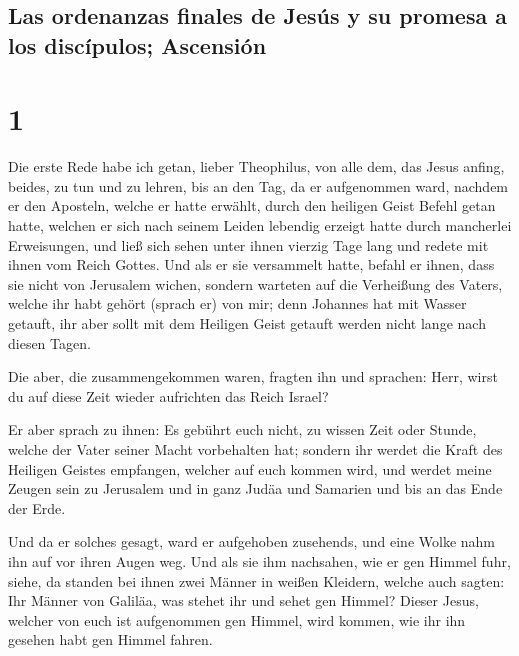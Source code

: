 \hypertarget{las-ordenanzas-finales-de-jesuxfas-y-su-promesa-a-los-discuxedpulos-ascensiuxf3n}{%
\subsection{Las ordenanzas finales de Jesús y su promesa a los
discípulos;
Ascensión}\label{las-ordenanzas-finales-de-jesuxfas-y-su-promesa-a-los-discuxedpulos-ascensiuxf3n}}

\hypertarget{section}{%
\section{1}\label{section}}

 Die erste Rede habe ich getan, lieber Theophilus, von
alle dem, das Jesus anfing, beides, zu tun und zu lehren, 
bis an den Tag, da er aufgenommen ward, nachdem er den Aposteln, welche
er hatte erwählt, durch den heiligen Geist Befehl getan hatte,
 welchen er sich nach seinem Leiden lebendig erzeigt hatte
durch mancherlei Erweisungen, und ließ sich sehen unter ihnen vierzig
Tage lang und redete mit ihnen vom Reich Gottes.  Und als
er sie versammelt hatte, befahl er ihnen, dass sie nicht von Jerusalem
wichen, sondern warteten auf die Verheißung des Vaters, welche ihr habt
gehört (sprach er) von mir;  denn Johannes hat mit Wasser
getauft, ihr aber sollt mit dem Heiligen Geist getauft werden nicht
lange nach diesen Tagen.

 Die aber, die zusammengekommen waren, fragten ihn und
sprachen: Herr, wirst du auf diese Zeit wieder aufrichten das Reich
Israel?

 Er aber sprach zu ihnen: Es gebührt euch nicht, zu wissen
Zeit oder Stunde, welche der Vater seiner Macht vorbehalten hat;
 sondern ihr werdet die Kraft des Heiligen Geistes
empfangen, welcher auf euch kommen wird, und werdet meine Zeugen sein zu
Jerusalem und in ganz Judäa und Samarien und bis an das Ende der Erde.

 Und da er solches gesagt, ward er aufgehoben zusehends,
und eine Wolke nahm ihn auf vor ihren Augen weg.  Und als
sie ihm nachsahen, wie er gen Himmel fuhr, siehe, da standen bei ihnen
zwei Männer in weißen Kleidern,  welche auch sagten: Ihr
Männer von Galiläa, was stehet ihr und sehet gen Himmel? Dieser Jesus,
welcher von euch ist aufgenommen gen Himmel, wird kommen, wie ihr ihn
gesehen habt gen Himmel fahren.

